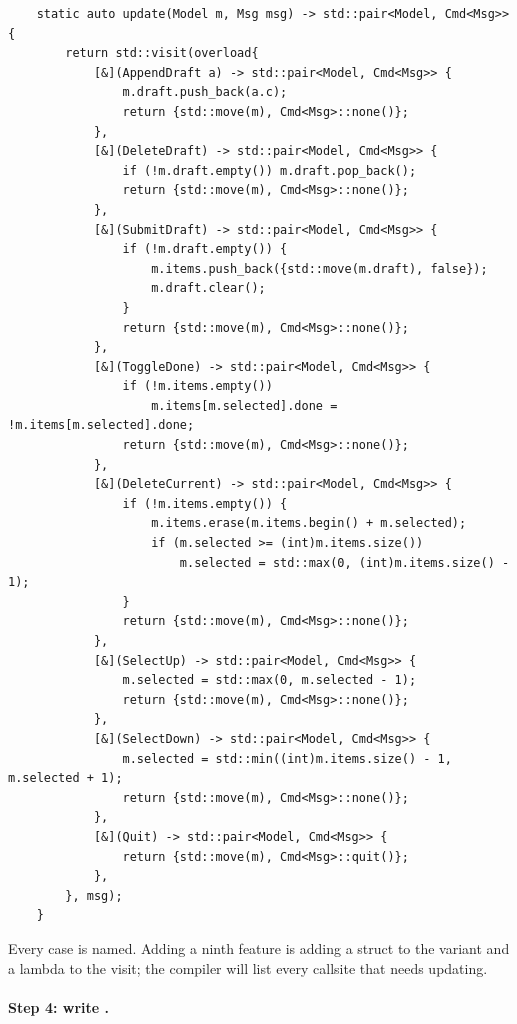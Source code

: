 \begin{lstlisting}
    static auto update(Model m, Msg msg) -> std::pair<Model, Cmd<Msg>> {
        return std::visit(overload{
            [&](AppendDraft a) -> std::pair<Model, Cmd<Msg>> {
                m.draft.push_back(a.c);
                return {std::move(m), Cmd<Msg>::none()};
            },
            [&](DeleteDraft) -> std::pair<Model, Cmd<Msg>> {
                if (!m.draft.empty()) m.draft.pop_back();
                return {std::move(m), Cmd<Msg>::none()};
            },
            [&](SubmitDraft) -> std::pair<Model, Cmd<Msg>> {
                if (!m.draft.empty()) {
                    m.items.push_back({std::move(m.draft), false});
                    m.draft.clear();
                }
                return {std::move(m), Cmd<Msg>::none()};
            },
            [&](ToggleDone) -> std::pair<Model, Cmd<Msg>> {
                if (!m.items.empty())
                    m.items[m.selected].done = !m.items[m.selected].done;
                return {std::move(m), Cmd<Msg>::none()};
            },
            [&](DeleteCurrent) -> std::pair<Model, Cmd<Msg>> {
                if (!m.items.empty()) {
                    m.items.erase(m.items.begin() + m.selected);
                    if (m.selected >= (int)m.items.size())
                        m.selected = std::max(0, (int)m.items.size() - 1);
                }
                return {std::move(m), Cmd<Msg>::none()};
            },
            [&](SelectUp) -> std::pair<Model, Cmd<Msg>> {
                m.selected = std::max(0, m.selected - 1);
                return {std::move(m), Cmd<Msg>::none()};
            },
            [&](SelectDown) -> std::pair<Model, Cmd<Msg>> {
                m.selected = std::min((int)m.items.size() - 1, m.selected + 1);
                return {std::move(m), Cmd<Msg>::none()};
            },
            [&](Quit) -> std::pair<Model, Cmd<Msg>> {
                return {std::move(m), Cmd<Msg>::quit()};
            },
        }, msg);
    }
\end{lstlisting}

Every case is named. Adding a ninth feature is adding a struct to
the variant and a lambda to the visit; the compiler will list every
callsite that needs updating.

\paragraph{Step 4: write .}

